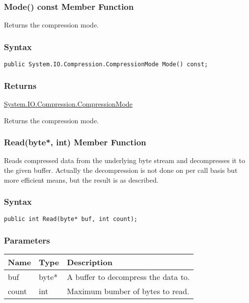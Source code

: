 \documentclass[a4paper,oneside,11.000000pt]{book}
\begin{document}
\hypertarget{System.IO.Compression.DeflateStream.Mode.C.P.System.IO.Compression.DeflateStream}{\subsubsection*{Mode() const Member Function}}\begin{flushleft}
Returns the compression mode.

\end{flushleft}

\subsubsection*{Syntax}\texttt{public System.IO.Compression.CompressionMode Mode() const;}

\subsubsection*{Returns}
\hyperlink{System.IO.Compression.CompressionMode}{System.\-IO.\-Compression.\-CompressionMode}\begin{flushleft}
Returns the compression mode.

\end{flushleft}
\clearpage

\hypertarget{System.IO.Compression.DeflateStream.Read.P.System.IO.Compression.DeflateStream.P.byte.int}{\subsubsection*{Read(byte*, int) Member Function}}
\begin{flushleft}
Reads compressed data from the underlying byte stream and decompresses it to the given buffer.
Actually the decompression is not done on per call basis but more efficient means, but
the result is as described.

\end{flushleft}
\subsubsection*{Syntax}\texttt{public int Read(byte* buf, int count);}

\subsubsection*{Parameters}
\begin{flushleft}
\begin{supertabular}[l]{lll}
\textbf{Name}
& \textbf{Type}
& \textbf{Description}
\\
\hline
buf
& byte*
& A buffer to decompress the data to.

\\
count
& int
& Maximum bumber of bytes to read.

\\
\end{supertabular}

\end{flushleft}
\end{document}
